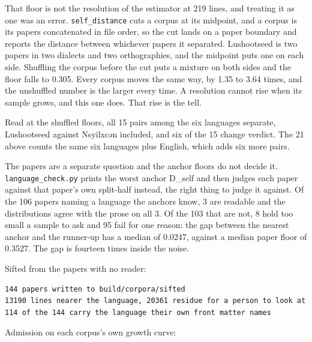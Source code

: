 That floor is not the resolution of the estimator at 219 lines, and treating it as one was an error. \texttt{self\_\allowbreak{}distance} cuts a corpus at its midpoint, and a corpus is its papers concatenated in file order, so the cut lands on a paper boundary and reports the distance between whichever papers it separated. Lushootseed is two papers in two dialects and two orthographies, and the midpoint puts one on each side. Shuffling the corpus before the cut puts a mixture on both sides and the floor falls to 0.305. Every corpus moves the same way, by 1.35 to 3.64 times, and the unshuffled number is the larger every time. A resolution cannot rise when its sample grows, and this one does. That rise is the tell.

Read at the shuffled floors, all 15 pairs among the six languages separate, Lushootseed against Nsyilxcən included, and six of the 15 change verdict. The 21 above counts the same six languages plus English, which adds six more pairs.

The papers are a separate question and the anchor floors do not decide it. \texttt{language\_\allowbreak{}check.\allowbreak{}py} prints the worst anchor D\_self and then judges each paper against that paper's own split-half instead, the right thing to judge it against. Of the 106 papers naming a language the anchors know, 3 are readable and the distributions agree with the prose on all 3. Of the 103 that are not, 8 hold too small a sample to ask and 95 fail for one reason: the gap between the nearest anchor and the runner-up has a median of 0.0247, against a median paper floor of 0.3527. The gap is fourteen times inside the noise.

Sifted from the papers with no reader:

\begin{lstlisting}[breaklines=true,breakatwhitespace=false,basicstyle=\ttfamily\small]
144 papers written to build/corpora/sifted
13190 lines nearer the language, 20361 residue for a person to look at
114 of the 144 carry the language their own front matter names
\end{lstlisting}

Admission on each corpus's own growth curve:

